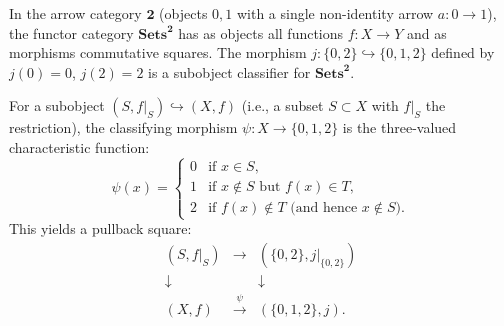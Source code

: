 In the arrow category $\mathbf{2}$ (objects $0, 1$ with a single non-identity arrow $a : 0 \to 1$), the functor category $\mathbf{Sets}^{\mathbf{2}}$ has as objects all functions $f : X \to Y$ and as morphisms commutative squares. The morphism $j : \{0, 2\} \hookrightarrow \{0, 1, 2\}$ defined by $j(0) = 0$, $j(2) = 2$ is a subobject classifier for $\mathbf{Sets}^{\mathbf{2}}$.

For a subobject $(S, f|_S) \hookrightarrow (X, f)$ (i.e., a subset $S \subset X$ with $f|_S$ the restriction), the classifying morphism $\psi : X \to \{0, 1, 2\}$ is the three-valued characteristic function:
$$
\psi(x) =
\begin{cases}
0 & \text{if } x \in S, \\
1 & \text{if } x \notin S \text{ but } f(x) \in T, \\
2 & \text{if } f(x) \notin T \text{ (and hence } x \notin S).
\end{cases}
$$
This yields a pullback square:
$$
\begin{array}{ccc}
(S, f|_S) & \longrightarrow & (\{0,2\}, j|_{\{0,2\}}) \\[4pt]
\downarrow & & \downarrow \\[4pt]
(X, f) & \xrightarrow{\;\psi\;} & (\{0,1,2\}, j).
\end{array}
$$

